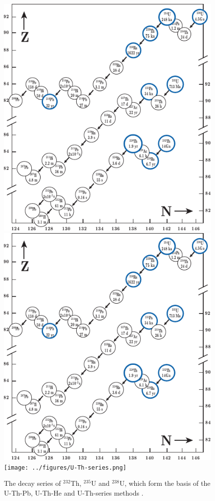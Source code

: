 \begin{figure}[!ht]
  \captionsetup{width=11cm}
  \centering
  \ifpdf
  \ifuclnotes
  \includegraphics[width=\textwidth]{../figures/U-Th-series.pdf}
  \else
  \includegraphics[width=12cm]{../figures/U-Th-series.pdf}
  \fi
  \else
  \texttt{[image: ../figures/U-Th-series.png]}
  \fi
  \caption{The decay series of $^{232}$Th, $^{235}$U and $^{238}$U,
    which form the basis of the U-Th-Pb, U-Th-He and U-Th-series methods
    \citep[modified from][]{allegre2008}.}
  \label{fig:U-Th-series}
\end{figure}
